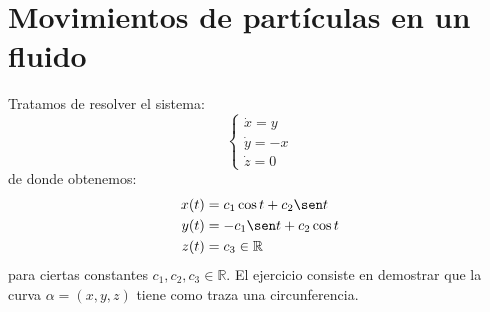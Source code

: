 \section{Movimientos de partículas en un fluido}

\begin{ejercicio} %
    Tratamos de resolver el sistema:
    \begin{equation*}
        \left\{\begin{array}{l}
                \dot{x} = y \\
                \dot{y} = -x \\
                \dot{z} = 0
        \end{array}\right.
    \end{equation*}
    de donde obtenemos:
    \begin{align*}
        x(t) &= c_1\cos t + c_2\sen t \\
        y(t) &= -c_1\sen t +c_2\cos t \\
        z(t) &= c_3 \in \mathbb{R}
    \end{align*}
    para ciertas constantes $c_1,c_2,c_3\in \mathbb{R}$. El ejercicio consiste en demostrar que la curva $\alpha = (x,y,z)$ tiene como traza una circunferencia.\\


\end{ejercicio}
